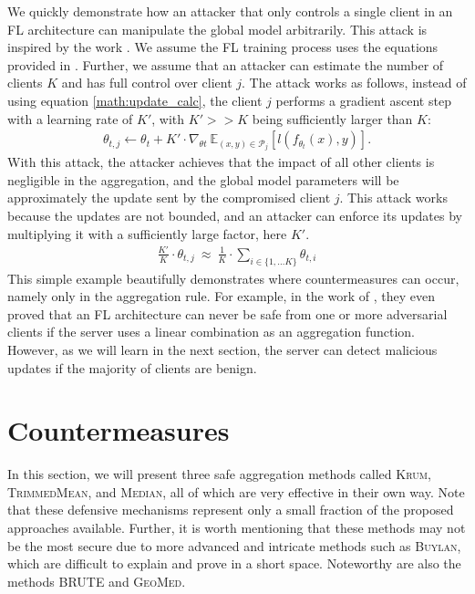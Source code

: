 \documentclass[conference]{IEEEtran}
\begin{document}
We quickly demonstrate how an attacker that only controls a single client in an FL architecture can manipulate the global model arbitrarily. This attack is inspired by the work \cite{Blanchard2017}. We assume the FL training process uses the equations provided in . Further, we assume that an attacker can estimate the number of clients $K$ and has full control over client $j$. The attack works as follows, instead of using equation \ref{math:update_calc}, the client $j$ performs a gradient ascent step with a learning rate of $K'$, with $K' >> K$ being sufficiently larger than $K$:
\begin{align}
    \theta_{t,j} \leftarrow \theta_{t} + K' \cdot \nabla_{\theta t} \  \mathbb{E}_{(x,y)\in \mathcal{P}_j}[l(f_{\theta_t}(x), y)].
\end{align}
With this attack, the attacker achieves that the impact of all other clients is negligible in the aggregation, and the global model parameters will be approximately the update sent by the compromised client $j$. This attack works because the updates are not bounded, and an attacker can enforce its updates by multiplying it with a sufficiently large factor, here $K'$.
\begin{align}
    \frac{K'}{K} \cdot \theta_{t,j} \  \approx \ \frac{1}{K} \cdot \sum\limits_{i \in \{1, \ldots K\}} \theta_{t,i}
\end{align}
This simple example beautifully demonstrates where countermeasures can occur, namely only in the aggregation rule. For example, in the work of \cite{Blanchard2017}, they even proved that an FL architecture can never be safe from one or more adversarial clients if the server uses a linear combination as an aggregation function. However, as we will learn in the next section, the server can detect malicious updates if the majority of clients are benign.

\section{Countermeasures}\label{sec:counter_measures}
In this section, we will present three safe aggregation methods called \textsc{Krum}, \textsc{TrimmedMean}, and \textsc{Median}, all of which are very effective in their own way. Note that these defensive mechanisms represent only a small fraction of the proposed approaches available. Further, it is worth mentioning that these methods may not be the most secure due to more advanced and intricate methods such as \textsc{Buylan}, which are difficult to explain and prove in a short space. Noteworthy are also the methods \textsc{BRUTE}\cite{Mhamdi2018} and \textsc{GeoMed}\cite{Chen2017, Blanchard2017}.
\end{document}
